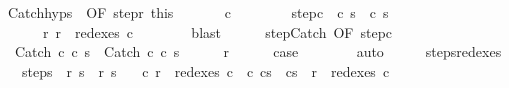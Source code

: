 \begin{isabellebody}
\ Catch{\isachardot}hyps\ {\isacharparenleft}{}{\isacharparenright}\ {\isacharbrackleft}OF\ step{\isacharunderscore}r\ this{\isacharbrackright}\ \isanewline
\ \ \ \ \isamarkupfalse%
\ c{\isacharprime}\ \ \isanewline
\ \ \ \ \ \ step{\isacharunderscore}c\ {\isachardoublequoteopen}{\isasymGamma}{\isasymturnstile}\ {\isacharparenleft}c\ s{\isacharparenright}\ {\isasymrightarrow}\ {\isacharparenleft}c{\isacharprime}{\isacharcomma}\ s{\isacharprime}{\isacharparenright}{\isachardoublequoteclose}\ \isanewline
\ \ \ \ \ \ r{\isacharprime}{\isacharcolon}\ {\isachardoublequoteopen}r{\isacharprime}\ {\isasymin}\ redexes\ c{\isacharprime}{\isachardoublequoteclose}\isanewline
\ \ \ \ \ \ \isamarkupfalse%
\ blast\isanewline
\ \ \ \ \isamarkupfalse%
\ step{\isachardot}Catch\ {\isacharbrackleft}OF\ step{\isacharunderscore}c\isanewline
\ \ \ \ \isamarkupfalse%
\ {\isachardoublequoteopen}{\isasymGamma}{\isasymturnstile}\ {\isacharparenleft}Catch\ c\ c\ s{\isacharparenright}\ {\isasymrightarrow}\ {\isacharparenleft}Catch\ c{\isacharprime}\ c\ s{\isacharprime}{\isacharparenright}{\isachardoublequoteclose}\isacommand{{\isachardot}}\isamarkupfalse%
\isanewline
\ \ \ \ \isamarkupfalse%
\ r{\isacharprime}\isanewline
\ \ \ \ \isamarkupfalse%
\ {\isacharquery}case\isanewline
\ \ \ \ \ \ \isamarkupfalse%
\ auto\isanewline
\ \ \isamarkupfalse%
\isanewline
{}\isamarkupfalse%
%
\endisatagproof
{\isafoldproof}%
%
\isadelimproof
\ \isanewline
%
\endisadelimproof
\isanewline
{}\isamarkupfalse%
\ steps{\isacharunderscore}redexes{\isacharcolon}\isanewline
\ \ \ steps{\isacharcolon}\ {\isachardoublequoteopen}{\isasymGamma}{\isasymturnstile}\ {\isacharparenleft}r{\isacharcomma}\ s{\isacharparenright}\ {\isasymrightarrow}\isactrlsup {\isacharasterisk}\ {\isacharparenleft}r{\isacharprime}{\isacharcomma}\ s{\isacharprime}{\isacharparenright}{\isachardoublequoteclose}\isanewline
\ \ \ {\isachardoublequoteopen}{\isasymAnd}c{\isachardot}\ r\ {\isasymin}\ redexes\ c\ {\isasymLongrightarrow}\ {\isasymexists}c{\isacharprime}{\isachardot}\ {\isasymGamma}{\isasymturnstile}{\isacharparenleft}c{\isacharcomma}s{\isacharparenright}\ {\isasymrightarrow}\isactrlsup {\isacharasterisk}\ {\isacharparenleft}c{\isacharprime}{\isacharcomma}s{\isacharprime}{\isacharparenright}\ {\isasymand}\ r{\isacharprime}\ {\isasymin}\ redexes\ c{\isacharprime}{\isachardoublequoteclose}\isanewline

\end{isabellebody}
